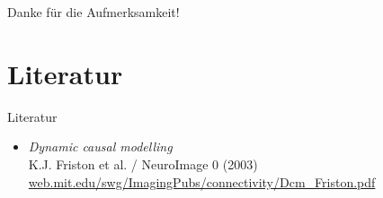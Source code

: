 \documentclass{beamer}
\begin{document}
\begin{frame}
\centering
\huge Danke für die Aufmerksamkeit!
\end{frame}


\section{Literatur}
	\begin{frame}{Literatur}
		\begin{itemize}
			\item \textit{Dynamic causal modelling} \\ {\small K.J. Friston et al. / NeuroImage 0 (2003)} \\ {\footnotesize \url{web.mit.edu/swg/ImagingPubs/connectivity/Dcm_Friston.pdf}}
		\end{itemize}
	\end{frame}



\end{document}
